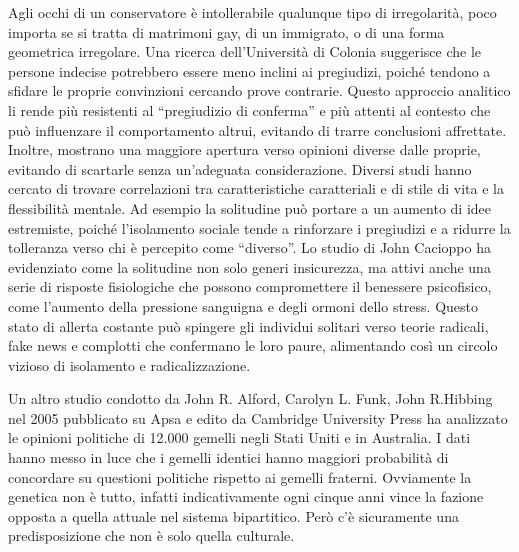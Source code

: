 \documentclass[12pt]{book} %
\begin{document}
Agli occhi di un conservatore è intollerabile qualunque tipo di irregolarità, poco importa se si tratta di matrimoni
gay, di un immigrato, o di una forma geometrica irregolare.
Una ricerca dell’Università di Colonia suggerisce che le persone indecise potrebbero essere meno inclini ai pregiudizi, poiché tendono a sfidare le proprie convinzioni cercando prove contrarie. Questo approccio analitico li rende più resistenti al “pregiudizio di conferma” e più attenti al contesto che può influenzare il comportamento altrui, evitando di trarre conclusioni affrettate. Inoltre, mostrano una maggiore apertura verso opinioni diverse dalle proprie, evitando di scartarle senza un’adeguata considerazione.
Diversi studi hanno cercato di trovare correlazioni tra caratteristiche caratteriali e di stile di vita e la flessibilità mentale. Ad esempio la solitudine può portare a un aumento di idee estremiste, poiché l’isolamento sociale tende a rinforzare i pregiudizi e a ridurre la tolleranza verso chi è percepito come “diverso”. Lo studio di John Cacioppo ha evidenziato come la solitudine non solo generi insicurezza, ma attivi anche una serie di risposte fisiologiche che possono compromettere il benessere psicofisico, come l’aumento della pressione sanguigna e degli ormoni dello stress. Questo stato di allerta costante può spingere gli individui solitari verso teorie radicali, fake news e complotti che confermano le loro paure, alimentando così un circolo vizioso di isolamento e radicalizzazione.

Un altro studio condotto da John R. Alford, Carolyn L. Funk, John R.Hibbing nel 2005 pubblicato su Apsa e edito da
Cambridge University
Press ha analizzato le opinioni politiche di 12.000 gemelli negli Stati Uniti e in Australia. I dati hanno messo in luce
che i gemelli identici hanno maggiori probabilità di concordare su questioni politiche rispetto ai gemelli fraterni.
Ovviamente la genetica non è tutto, infatti indicativamente ogni cinque anni vince la fazione opposta a quella attuale
nel sistema bipartitico. Però c'è sicuramente una predisposizione che non è solo quella
culturale.
\end{document}
